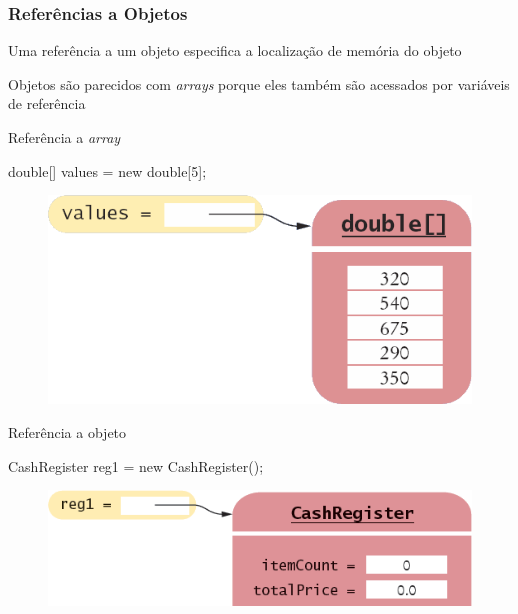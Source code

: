 \documentclass[xcolor={dvipsnames,table},aspectratio=169]{beamer}
\begin{document}
\begin{frame}[fragile]\frametitle{Referências a Objetos}
\begin{itemize}
{\small
	\item Uma referência a um objeto especifica a localização de memória do objeto
	\item Objetos são parecidos com \emph{arrays} porque eles também são acessados por variáveis de referência
	\begin{itemize}
{\small
		\item Referência a \emph{array}
\begin{javacode}
double[] values = new double[5];
\end{javacode}
\begin{figure}[h]
	\includegraphics[height=0.14\paperheight,center]{pucrs-ep-fprog-unidade_07-objetos_e_classes-laminas-referencia_a_array.png}
\end{figure}
		\item Referência a objeto
\begin{javacode}
CashRegister reg1 = new CashRegister();
\end{javacode}
\begin{figure}[h]
	\includegraphics[height=0.12\paperheight,center]{pucrs-ep-fprog-unidade_07-objetos_e_classes-laminas-referencia_a_objeto.png}
\end{figure}
}
	\end{itemize}
}
\end{itemize}
\end{frame}
\end{document}
